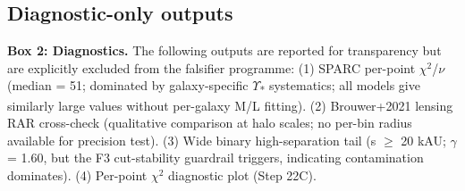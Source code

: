 \documentclass[11pt,a4paper]{article}
\begin{document}
\subsection{Diagnostic-only outputs}
\begin{mdframed}[linecolor=accent,linewidth=0.5pt,backgroundcolor=callout-bg,leftline=true,rightline=true,topline=true,bottomline=true,innerleftmargin=8pt,innerrightmargin=8pt,innertopmargin=6pt,innerbottommargin=6pt]
\textbf{Box 2: Diagnostics.} The following outputs are reported for transparency but are explicitly excluded from the falsifier programme: (1) SPARC per-point $\chi$$^{2}$/$\nu$ (median = 51; dominated by galaxy-specific $\Upsilon$\textsubscript{*} systematics; all models give similarly large values without per-galaxy M/\allowbreak{}L fitting). (2) Brouwer+2021 lensing RAR cross-check (qualitative comparison at halo scales; no per-bin radius available for precision test). (3) Wide binary high-separation tail (s $\ge$ 20 kAU; $\gamma$ = 1.60, but the F3 cut-stability guardrail triggers, indicating contamination dominates). (4) Per-point $\chi$$^{2}$ diagnostic plot (Step 22C).
\end{mdframed}
\end{document}
